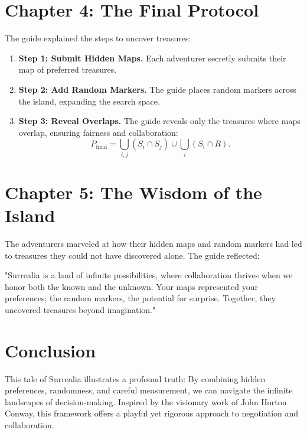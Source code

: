 \documentclass[12pt]{article}
\begin{document}
\section*{Chapter 4: The Final Protocol}

The guide explained the steps to uncover treasures:

\begin{enumerate}
    \item \textbf{Step 1: Submit Hidden Maps.} Each adventurer secretly submits their map of preferred treasures.
    \item \textbf{Step 2: Add Random Markers.} The guide places random markers across the island, expanding the search space.
    \item \textbf{Step 3: Reveal Overlaps.} The guide reveals only the treasures where maps overlap, ensuring fairness and collaboration:
    \[P_{\text{final}} = \bigcup_{i,j} (S_i \cap S_j) \cup \bigcup_i (S_i \cap R).\]
\end{enumerate}

\section*{Chapter 5: The Wisdom of the Island}

The adventurers marveled at how their hidden maps and random markers had led to treasures they could not have discovered alone. The guide reflected:

"Surrealia is a land of infinite possibilities, where collaboration thrives when we honor both the known and the unknown. Your maps represented your preferences; the random markers, the potential for surprise. Together, they uncovered treasures beyond imagination."

\section*{Conclusion}

This tale of Surrealia illustrates a profound truth: By combining hidden preferences, randomness, and careful measurement, we can navigate the infinite landscapes of decision-making. Inspired by the visionary work of John Horton Conway, this framework offers a playful yet rigorous approach to negotiation and collaboration.
\end{document}
